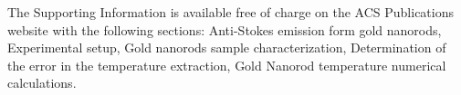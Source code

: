 \documentclass[journal=nalefd,manuscript=letter]{achemso}
\begin{document}
\begin{suppinfo}
The Supporting Information is available free of charge on the
ACS Publications website with the following sections:
Anti-Stokes emission form gold nanorods, 
Experimental setup,
Gold nanorods sample characterization,
Determination of the error in the temperature extraction,
Gold Nanorod temperature numerical calculations.

\end{suppinfo}




\end{document}
